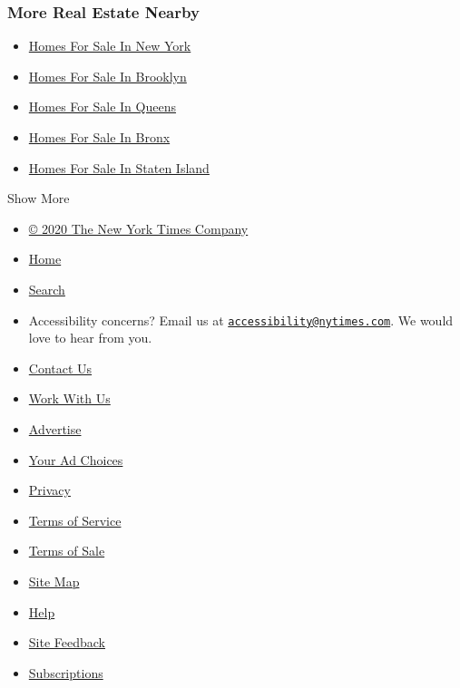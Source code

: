\hypertarget{more-real-estate-nearby}{%
\subsubsection{More Real Estate Nearby}\label{more-real-estate-nearby}}

\begin{itemize}
\tightlist
\item
  \href{/real-estate/usa/ny/new-yorknew-york-ny-usa/homes-for-sale}{Homes
  For Sale In New York}
\item
  \href{/real-estate/usa/ny/brooklynbrooklyn-ny-usa/homes-for-sale}{Homes
  For Sale In Brooklyn}
\item
  \href{/real-estate/usa/ny/queensqueens-ny-usa/homes-for-sale}{Homes
  For Sale In Queens}
\item
  \href{/real-estate/usa/ny/bronxbronx-ny-usa/homes-for-sale}{Homes For
  Sale In Bronx}
\item
  \href{/real-estate/usa/ny/staten-islandstaten-island-ny-usa/homes-for-sale}{Homes
  For Sale In Staten Island}
\end{itemize}

Show More

\begin{itemize}
\tightlist
\item
  \href{https://help.nytimes.com/hc/en-us/articles/115014792127-Copyright-notice}{©
  2020 The New York Times Company}
\item
  \href{https://www.nytimes.com}{Home}
\item
  \href{http://query.nytimes.com/search/sitesearch/\#/}{Search}
\item
  Accessibility concerns? Email us at
  \href{mailto:accessibility@nytimes.com}{\nolinkurl{accessibility@nytimes.com}}.
  We would love to hear from you.
\item
  \href{https://www.nytimes.com/ref/membercenter/help/infoservdirectory.html}{Contact
  Us}
\item
  \href{http://www.nytco.com/careers}{Work With Us}
\item
  \href{http://nytmediakit.com/}{Advertise}
\item
  \href{https://www.nytimes.com/content/help/rights/privacy/policy/privacy-policy.html\#pp}{Your
  Ad Choices}
\item
  \href{https://www.nytimes.com/privacy}{Privacy}
\item
  \href{https://help.nytimes.com/hc/en-us/articles/115014893428-Terms-of-service}{Terms
  of Service}
\item
  \href{https://help.nytimes.com/hc/en-us/articles/115014893968-Terms-of-sale}{Terms
  of Sale}
\item
  \href{http://spiderbites.nytimes.com}{Site Map}
\item
  \href{https://help.nytimes.com/hc/en-us}{Help}
\item
  \href{https://help.nytimes.com/hc/en-us/articles/115015385887-Contact-us}{Site
  Feedback}
\item
  \href{https://www.nytimes.com/subscriptions/Multiproduct/lp5558.html?campaignId=37WXW}{Subscriptions}
\end{itemize}

